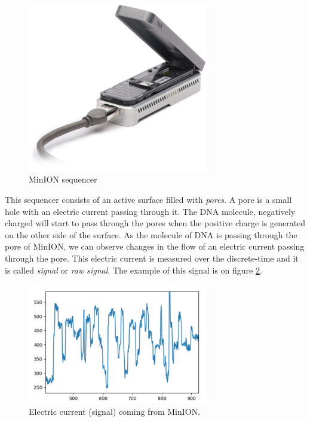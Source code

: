 \begin{figure}
\centerline{\includegraphics[width=0.7\textwidth, height=0.3\textheight]{images/minion}}
\caption[MinION]{MinION sequencer}
\label{obr:minIon}
\end{figure}

This sequencer consists of an active surface filled with \textit{pores}. A pore is a small
hole with an electric current passing through it. The DNA molecule, negatively charged
will start to pass through the pores when the positive charge is generated on the
other side of the surface. As the molecule of DNA is passing through the pore of
MinION, we can observe changes in the flow of an electric current passing through the pore.
This electric current is measured over the discrete-time and it is called \textit{signal}
or \textit{raw signal}. The example of this signal is on figure \ref{obr:minIonCurrent}.

\begin{figure}
\centerline{\includegraphics[width=0.7\textwidth, height=0.3\textheight]{images/signal}}
\caption[MinION signal]{Electric current (signal) coming from MinION.}
\label{obr:minIonCurrent}
\end{figure}

